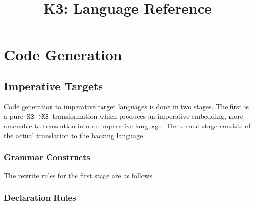 \documentclass{article}
\title{K3: Language Reference}
\author{}
\date{}
\newcommand{\K}{\texttt{K3}}
\begin{document}
    \maketitle

    \tableofcontents

    \todototoc
    \listoftodos

    \section{Code Generation}
    \subsection{Imperative Targets}

    Code generation to imperative target languages is done in two stages. The first is a pure $\K
    \rightarrow \K$ transformation which produces an imperative embedding, more amenable to
    translation into an imperative language. The second stage consists of the actual translation to
    the backing language.

    \subsubsection{Grammar Constructs}

    The rewrite rules for the first stage are as follows:

    \subsubsection{Declaration Rules}
\end{document}
